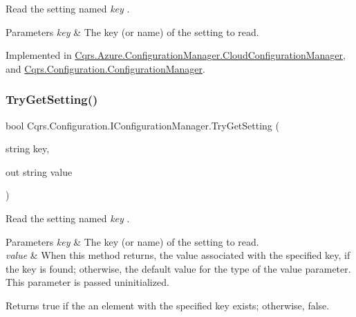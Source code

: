 Read the setting named {\itshape key} . 


\begin{DoxyParams}{Parameters}
{\em key} & The key (or name) of the setting to read.\\
\hline
\end{DoxyParams}


Implemented in \hyperlink{classCqrs_1_1Azure_1_1ConfigurationManager_1_1CloudConfigurationManager_a48228b7e2204a2449426de32cd6ecc65_a48228b7e2204a2449426de32cd6ecc65}{Cqrs.\+Azure.\+Configuration\+Manager.\+Cloud\+Configuration\+Manager}, and \hyperlink{classCqrs_1_1Configuration_1_1ConfigurationManager_ac3e31af665b95b781fee23f577170a63_ac3e31af665b95b781fee23f577170a63}{Cqrs.\+Configuration.\+Configuration\+Manager}.

\mbox{\label{interfaceCqrs_1_1Configuration_1_1IConfigurationManager_ac4478405e3d9e1c97d14953aea4e695b_ac4478405e3d9e1c97d14953aea4e695b}} 
\subsubsection{\texorpdfstring{Try\+Get\+Setting()}{TryGetSetting()}\hspace{0.1cm}{\footnotesize\ttfamily [1/2]}}
{\footnotesize\ttfamily bool Cqrs.\+Configuration.\+I\+Configuration\+Manager.\+Try\+Get\+Setting (\begin{DoxyParamCaption}\item[{string}]{key,  }\item[{out string}]{value }\end{DoxyParamCaption})}



Read the setting named {\itshape key} . 


\begin{DoxyParams}{Parameters}
{\em key} & The key (or name) of the setting to read.\\
\hline
{\em value} & When this method returns, the value associated with the specified key, if the key is found; otherwise, the default value for the type of the value parameter. This parameter is passed uninitialized.\\
\hline
\end{DoxyParams}
\begin{DoxyReturn}{Returns}
true if the an element with the specified key exists; otherwise, false.
\end{DoxyReturn}


